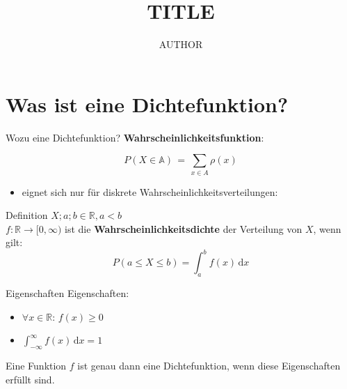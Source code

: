 \documentclass[14pt]{beamer}
\author{AUTHOR}
\title{TITLE}
\institute{Herder Gymnasium Berlin}
\date{}
\begin{document}
\begin{frame}
\titlepage
\end{frame}

\begin{frame}
\tableofcontents
\end{frame}

\section{Was ist eine Dichtefunktion?}
\begin{frame}{Wozu eine Dichtefunktion?}
\textbf{Wahrscheinlichkeitsfunktion}:

{\small $$ P(X \in\mathbb{A}) \, = \, \sum_{x\in A} \rho(x) $$}
\begin{itemize}

\item eignet sich nur für diskrete Wahrscheinlichkeitsverteilungen:

\begin{itemize}
\end{itemize}
\end{itemize}

\end{frame}

\begin{frame}{Definition}
$ X;a;b \in \mathbb{R}, a<b$\\
$f \colon \mathbb{R} \rightarrow [0,\infty)$ ist die \textbf{Wahrscheinlichkeitsdichte} der Verteilung von $X$, wenn gilt:
$$
P(a\leq X\leq b)=\int_a^bf(x)\,\mathrm dx
$$

\end{frame}

\begin{frame}{Eigenschaften}
Eigenschaften:
\begin{itemize}
\item $\forall x \in \mathbb{R}:\, f(x)\geq 0$
\item $\int_{-\infty}^\infty f(x)\,{\mathrm d}x = 1$
\end{itemize}
Eine Funktion $f$ ist genau dann eine Dichtefunktion, wenn diese Eigenschaften erfüllt sind.
\end{frame}
\end{document}
